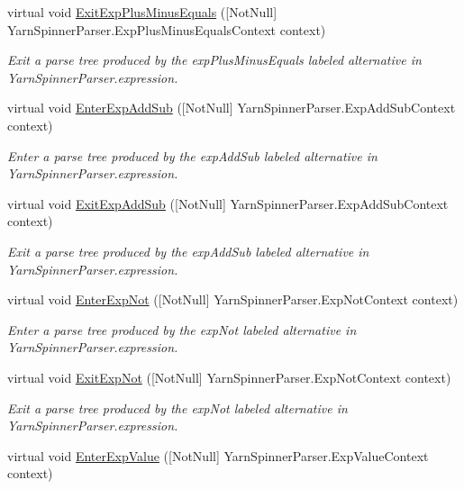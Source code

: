\begin{DoxyCompactItemize}
virtual void \hyperlink{a00190_a6fc472ff3937457adf2c286c37a61b7a}{Exit\-Exp\-Plus\-Minus\-Equals} (\mbox{[}Not\-Null\mbox{]} Yarn\-Spinner\-Parser.\-Exp\-Plus\-Minus\-Equals\-Context context)
\begin{DoxyCompactList}\small\item\em Exit a parse tree produced by the {\ttfamily exp\-Plus\-Minus\-Equals} labeled alternative in Yarn\-Spinner\-Parser.\-expression. \end{DoxyCompactList}\item 
virtual void \hyperlink{a00190_a63f01bf3112c5c181e607aa954dfbf7a}{Enter\-Exp\-Add\-Sub} (\mbox{[}Not\-Null\mbox{]} Yarn\-Spinner\-Parser.\-Exp\-Add\-Sub\-Context context)
\begin{DoxyCompactList}\small\item\em Enter a parse tree produced by the {\ttfamily exp\-Add\-Sub} labeled alternative in Yarn\-Spinner\-Parser.\-expression. \end{DoxyCompactList}\item 
virtual void \hyperlink{a00190_afb75f12ecf35ef5e3886ada6e5519c28}{Exit\-Exp\-Add\-Sub} (\mbox{[}Not\-Null\mbox{]} Yarn\-Spinner\-Parser.\-Exp\-Add\-Sub\-Context context)
\begin{DoxyCompactList}\small\item\em Exit a parse tree produced by the {\ttfamily exp\-Add\-Sub} labeled alternative in Yarn\-Spinner\-Parser.\-expression. \end{DoxyCompactList}\item 
virtual void \hyperlink{a00190_ad89ca0922b0ff190fc532a9ae98d49d3}{Enter\-Exp\-Not} (\mbox{[}Not\-Null\mbox{]} Yarn\-Spinner\-Parser.\-Exp\-Not\-Context context)
\begin{DoxyCompactList}\small\item\em Enter a parse tree produced by the {\ttfamily exp\-Not} labeled alternative in Yarn\-Spinner\-Parser.\-expression. \end{DoxyCompactList}\item 
virtual void \hyperlink{a00190_afba9f6d1f3ede7b042a34ef3bc7b67bb}{Exit\-Exp\-Not} (\mbox{[}Not\-Null\mbox{]} Yarn\-Spinner\-Parser.\-Exp\-Not\-Context context)
\begin{DoxyCompactList}\small\item\em Exit a parse tree produced by the {\ttfamily exp\-Not} labeled alternative in Yarn\-Spinner\-Parser.\-expression. \end{DoxyCompactList}\item 
virtual void \hyperlink{a00190_a72f405648a0cee5cbd9adf15981fb1ff}{Enter\-Exp\-Value} (\mbox{[}Not\-Null\mbox{]} Yarn\-Spinner\-Parser.\-Exp\-Value\-Context context)

\end{DoxyCompactItemize}
